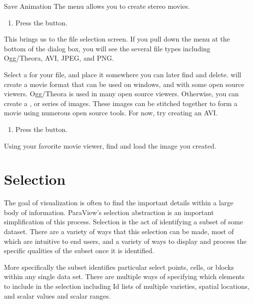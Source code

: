 \begin{exercise}{Save Animation}
  The  menu allows you to create
  stereo movies.
  \begin{enumerate}
    \restorecounter
    \item Press the  button.
    \savecounter
  \end{enumerate}

  This brings us to the file selection screen.  If you pull down the menu
   at the bottom of the dialog box, you will see the
  several file types including Ogg/Theora,
  AVI, JPEG, and
  PNG.

  Select a  for your file, and place it somewhere you can
  later find and delete.   will create a movie format that
  can be used on windows, and with some open source viewers.
  Ogg/Theora is used in many open source viewers.  Otherwise,
  you can create a , or series of images.  These images
  can be stitched together to form a movie using numerous open source
  tools.  For now, try creating an AVI.

  \begin{enumerate}
    \restorecounter
    \item Press the  button.
  \end{enumerate}

  Using your favorite movie viewer, find and load the image you created.
\end{exercise}



\section{Selection}
\label{sec:Selection}

The goal of visualization is often to find the important details within a
large body of information. ParaView's selection abstraction is an
important simplification of this process. Selection is the act of
identifying a subset of some dataset. There are a variety of ways that
this selection can be made, most of which are intuitive to end users,
and a variety of ways to display and process the specific qualities of
the subset once it is identified.

More specifically the subset identifies particular select points, cells, or
blocks within any single data set.  There are multiple ways of
specifying which elements to include in the selection including Id
lists of multiple varieties, spatial locations, and scalar values and
scalar ranges.

